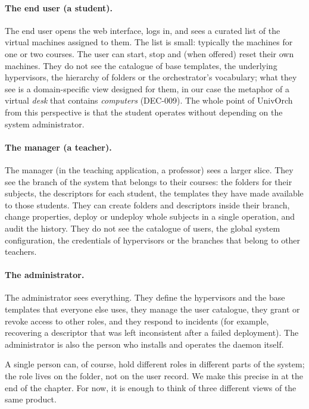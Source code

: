 \paragraph{The end user (a student).}
The end user opens the web interface, logs in, and sees a curated
list of the virtual machines assigned to them. The list is small:
typically the machines for one or two courses. The user can start,
stop and (when offered) reset their own machines. They do not see
the catalogue of base templates, the underlying hypervisors, the
hierarchy of folders or the orchestrator's vocabulary; what they see
is a domain-specific view designed for them, in our case the
metaphor of a virtual \emph{desk} that contains \emph{computers}
(DEC-009). The whole point of UnivOrch from this perspective is
that the student operates without depending on the system
administrator.

\paragraph{The manager (a teacher).}
The manager (in the teaching application, a professor) sees a
larger slice. They see the branch of the system that belongs to
their courses: the folders for their subjects, the descriptors for
each student, the templates they have made available to those
students. They can create folders and descriptors inside their
branch, change properties, deploy or undeploy whole subjects in a
single operation, and audit the history. They do not see the
catalogue of users, the global system configuration, the credentials
of hypervisors or the branches that belong to other teachers.

\paragraph{The administrator.}
The administrator sees everything. They define the hypervisors and
the base templates that everyone else uses, they manage the user
catalogue, they grant or revoke access to other roles, and they
respond to incidents (for example, recovering a descriptor that was
left inconsistent after a failed deployment). The administrator is
also the person who installs and operates the daemon itself.

A single person can, of course, hold different roles in different
parts of the system; the role lives on the folder, not on the user
record. We make this precise in  at the end of
the chapter. For now, it is enough to think of three different views
of the same product.

